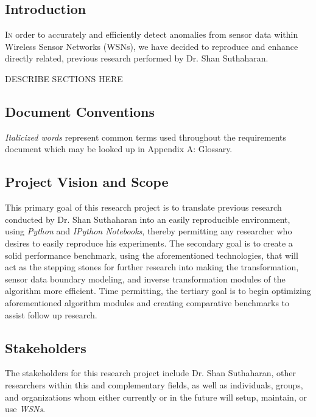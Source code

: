 \documentclass[twoside]{article}
\begin{document}
\begin{multicols}{2} %

\section{Introduction}

\lettrine[nindent=0em,lines=3]{I} n order to accurately and efficiently detect anomalies from sensor data within Wireless Sensor Networks (WSNs), we have decided to reproduce and enhance directly related, previous research performed by Dr. Shan Suthaharan.

DESCRIBE SECTIONS HERE

\subsection{Document Conventions}
\textit{Italicized words} represent common terms used throughout the requirements document which may be looked up in Appendix A: Glossary.

\subsection{Project Vision and Scope}
This primary goal of this research project is to translate previous research conducted by Dr. Shan Suthaharan into an easily reproducible environment, using \textit{Python} and \textit{IPython Notebooks}, thereby permitting any researcher who desires to easily reproduce his experiments. The secondary goal is to create a solid performance benchmark, using the aforementioned technologies, that will act as the stepping stones for further research into making the transformation, sensor data boundary modeling, and inverse transformation modules of the algorithm more efficient. Time permitting, the tertiary goal is to begin optimizing aforementioned algorithm modules and creating comparative benchmarks to assist follow up research.

\subsection{Stakeholders}
The stakeholders for this research project include Dr. Shan Suthaharan, other researchers within this and complementary fields, as well as individuals, groups, and organizations whom either currently or in the future will setup, maintain, or use \textit{WSNs}.


\end{multicols}
\end{document}
